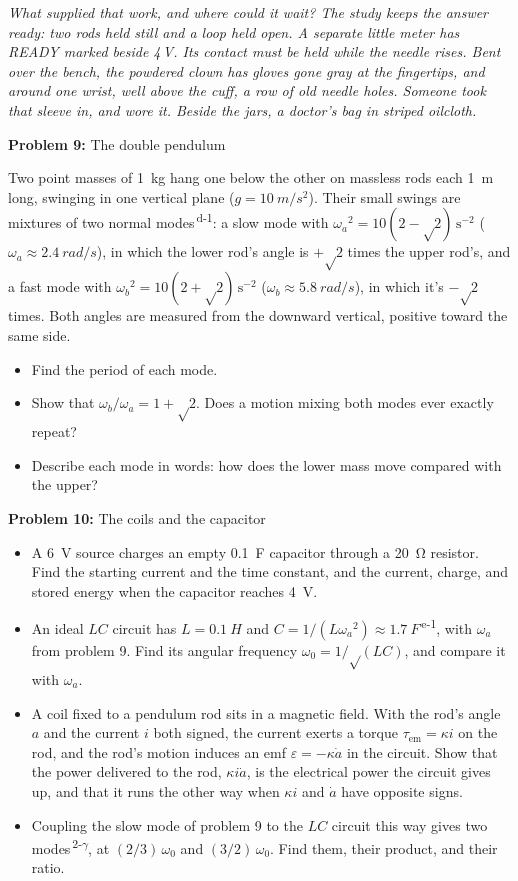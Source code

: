 \documentclass[11pt]{article}
\newcommand{\room}[1]{\par\bigskip{\large\bfseries #1}\par\nopagebreak\smallskip}
\newcommand{\scene}[1]{\par{\itshape #1}\par}
\newcommand{\problem}[2]{\par\medskip\textbf{Problem #1:} #2\par\nopagebreak}
\newenvironment{parts}{\begin{itemize}[leftmargin=3.4em,labelwidth=2.8em,labelsep=0.6em,align=left,itemsep=3pt,topsep=4pt]}{\end{itemize}}
\newcommand{\pt}[1]{\item[\textbf{#1}]}
\newcommand{\sv}[1]{\textsuperscript{\dag\,#1}}
\newcommand{\rt}{\text{√}}  %
\begin{document}
\room{Study}
\scene{What supplied that work, and where could it wait? The study keeps the answer ready: two rods held still and a loop held open. A separate little meter has READY marked beside 4\,V. Its contact must be held while the needle rises. Bent over the bench, the powdered clown has gloves gone gray at the fingertips, and around one wrist, well above the cuff, a row of old needle holes. Someone took that sleeve in, and wore it. Beside the jars, a doctor's bag in striped oilcloth.}
\problem{9}{The double pendulum}
Two point masses of \SI{1}{kg} hang one below the other on massless rods each \SI{1}{m} long, swinging in one vertical plane ($g = \SI{10}{m/s^2}$). Their small swings are mixtures of two normal modes\sv{d-1}: a slow mode with $\omega_a{}^2 = 10(2 - \rt2)\,\mathrm{s^{-2}}$ ($\omega_a \approx \SI{2.4}{rad/s}$), in which the lower rod's angle is $+\rt2$ times the upper rod's, and a fast mode with $\omega_b{}^2 = 10(2 + \rt2)\,\mathrm{s^{-2}}$ ($\omega_b \approx \SI{5.8}{rad/s}$), in which it's $-\rt2$ times. Both angles are measured from the downward vertical, positive toward the same side.
\begin{parts}
\pt{9-a} Find the period of each mode.
\pt{9-b} Show that $\omega_b/\omega_a = 1 + \rt2$. Does a motion mixing both modes ever exactly repeat?
\pt{9-c} Describe each mode in words: how does the lower mass move compared with the upper?
\end{parts}

\clearpage
\problem{10}{The coils and the capacitor}
\begin{parts}
\pt{10-a} A \SI{6}{V} source charges an empty \SI{0.1}{F} capacitor through a \SI{20}{\ohm} resistor. Find the starting current and the time constant, and the current, charge, and stored energy when the capacitor reaches \SI{4}{V}.
\pt{10-b} An ideal $LC$ circuit has $L = \SI{0.1}{H}$ and $C = 1/(L\omega_a{}^2) \approx \SI{1.7}{F}$\sv{e-1}, with $\omega_a$ from problem 9. Find its angular frequency $\omega_0 = 1/\rt(LC)$, and compare it with $\omega_a$.
\pt{10-c} A coil fixed to a pendulum rod sits in a magnetic field. With the rod's angle $a$ and the current $i$ both signed, the current exerts a torque $\tau_{\mathrm{em}} = \kappa i$ on the rod, and the rod's motion induces an emf $\varepsilon = -\kappa\dot a$ in the circuit. Show that the power delivered to the rod, $\kappa i\dot a$, is the electrical power the circuit gives up, and that it runs the other way when $\kappa i$ and $\dot a$ have opposite signs.
\pt{10-d} Coupling the slow mode of problem 9 to the $LC$ circuit this way gives two modes\sv{2-$\gamma$}, at $(2/3)\,\omega_0$ and $(3/2)\,\omega_0$. Find them, their product, and their ratio.
\end{parts}
\end{document}

